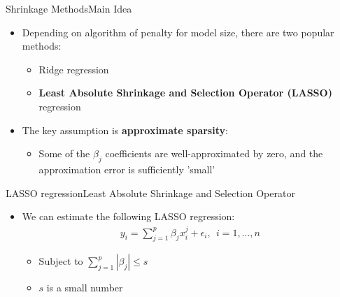 \documentclass[hyperref={pdfpagelabels=false}]{beamer}
\begin{document}
	


	\begin{frame}{Shrinkage Methods}{Main Idea}
\begin{itemize}
	
	\item Depending on algorithm of penalty for model size, there are two popular methods: 
	\vspace{0.2cm}
	\begin{itemize}
		\item Ridge regression
		\vspace{0.2cm}
		\item \textbf{Least Absolute Shrinkage and Selection Operator (LASSO)} regression
				\vspace{0.2cm}
	\end{itemize}
	
		\item The key assumption is \textbf{approximate sparsity}: 
	\vspace{0.2cm}
	\begin{itemize}
		\item Some of the $\beta_{j}$ coefficients are well-approximated by zero, and the approximation error is sufficiently 'small'
	\end{itemize}
\end{itemize}
\end{frame}
	


\begin{frame}{LASSO regression}{Least Absolute Shrinkage and Selection Operator}
	\begin{itemize}
		\item We can estimate the following LASSO regression:
		\vspace{0.2cm}
		\begin{eqnarray*}
			y_{i} = \sum^{p}_{j=1} \beta_{j} x^{j}_{i}  + \epsilon_{i},  \ \ i=1, \ldots ,n
		\end{eqnarray*}	
		
		\begin{itemize}
			\vspace{0.2cm}
			\item Subject to $\sum^{p}_{j=1} |\beta_{j}| \leq s$
			\vspace{0.2cm}
			\item $s$ is a small number		
		\end{itemize}	
	\end{itemize}
\end{frame}
\end{document}
